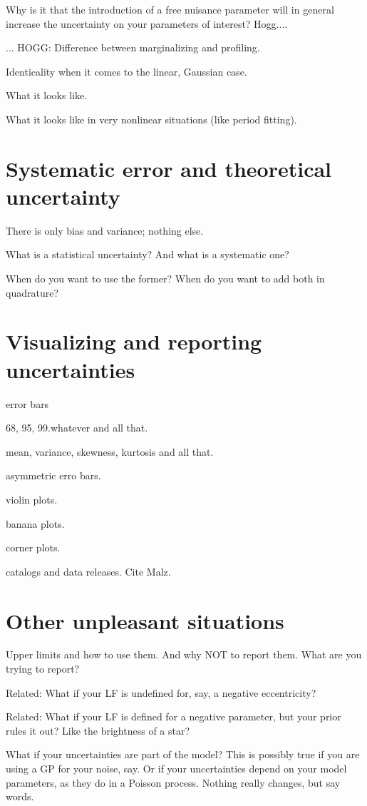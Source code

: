 \documentclass[10pt]{article}
\begin{document}
Why is it that the introduction of a free nuisance parameter will in general
increase the uncertainty on your parameters of interest? Hogg....

... HOGG: Difference between marginalizing and profiling.

Identicality when it comes to the linear, Gaussian case.

What it looks like.

What it looks like in very nonlinear situations (like period fitting).

\section{Systematic error and theoretical uncertainty}

There is only bias and variance; nothing else.

What is a statistical uncertainty? And what is a systematic one?

When do you want to use the former? When do you want to add both in quadrature?

\section{Visualizing and reporting uncertainties}\label{sec:viz}

error bars

68, 95, 99.whatever and all that.

mean, variance, skewness, kurtosis and all that.

asymmetric erro bars.

violin plots.

banana plots.

corner plots.

catalogs and data releases. Cite Malz.

\section{Other unpleasant situations}

Upper limits and how to use them. And why NOT to report them. What are
you trying to report?

Related: What if your LF is undefined for, say, a negative eccentricity?

Related: What if your LF is defined for a negative parameter, but your
prior rules it out? Like the brightness of a star?

What if your uncertainties are part of the model? This is possibly
true if you are using a GP for your noise, say. Or if your
uncertainties depend on your model parameters, as they do in a Poisson
process. Nothing really changes, but say words.
\end{document}
